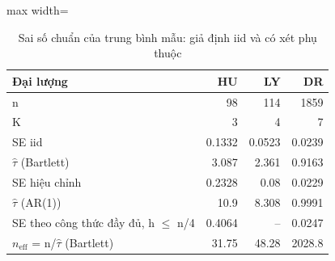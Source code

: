 \begin{table}[H]
\centering\footnotesize
\caption{Sai số chuẩn của trung bình mẫu: giả định iid và có xét phụ thuộc}\label{tab:tab_b11_03_mean_se}
\begin{adjustbox}{max width=\linewidth}
\begin{tabular}{|l|r|r|r|}
\toprule
Đại lượng & HU & LY & DR \\
\midrule
n & 98 & 114 & 1859 \\
K & 3 & 4 & 7 \\
SE iid & 0.1332 & 0.0523 & 0.0239 \\
$\hat{\tau}$ (Bartlett) & 3.087 & 2.361 & 0.9163 \\
SE hiệu chỉnh & 0.2328 & 0.08 & 0.0229 \\
$\hat{\tau}$ (AR(1)) & 10.9 & 8.308 & 0.9991 \\
SE theo công thức đầy đủ, h $\le$ n/4 & 0.4064 & – & 0.0247 \\
$n_{\mathrm{eff}}$ = n/$\hat{\tau}$ (Bartlett) & 31.75 & 48.28 & 2028.8 \\
\bottomrule
\end{tabular}
\end{adjustbox}\par{}
\end{table}
